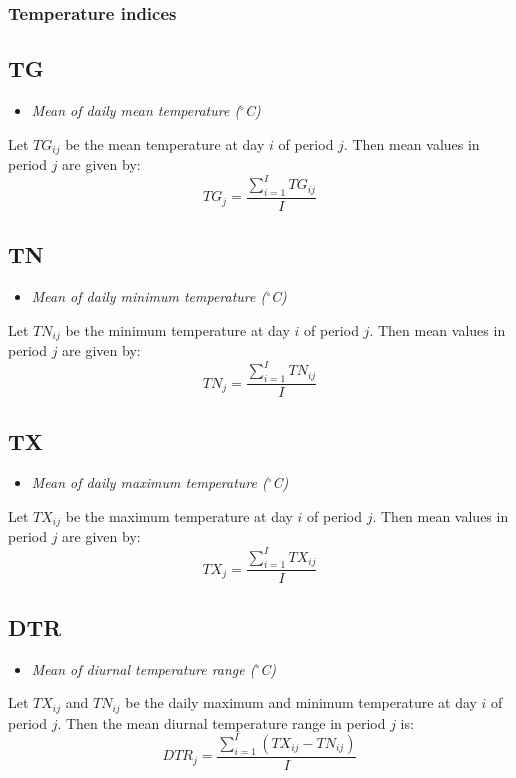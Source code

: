 \documentclass[a4paper,11pt]{article}
\begin{document}
\subsubsection{Temperature indices}

\subsection*{TG}
\begin{itemize}
\item \textit{Mean of daily mean temperature ($^\circ$C)}
\end{itemize}
Let $TG_{ij}$ be the mean temperature at day $i$ of period $j$. Then
mean values in period $j$ are given by:
\begin{equation*}
TG_{j} = \frac{\sum_{i=1}^{I}TG_{ij}}{I}
\end{equation*}

\subsection*{TN}
\begin{itemize}
\item \textit{Mean of daily minimum temperature ($^\circ$C)}
\end{itemize}
Let $TN_{ij}$ be the minimum temperature at day $i$ of period $j$. Then
mean values in period $j$ are given by:
\begin{equation*}
TN_{j} = \frac{\sum_{i=1}^{I}TN_{ij}}{I}
\end{equation*}

\subsection*{TX}
\begin{itemize}
\item \textit{Mean of daily maximum temperature ($^\circ$C)}
\end{itemize}
Let $TX_{ij}$ be the maximum temperature at day $i$ of period $j$. Then
mean values in period $j$ are given by:
\begin{equation*}
TX_{j} = \frac{\sum_{i=1}^{I}TX_{ij}}{I}
\end{equation*}

\subsection*{DTR}
\begin{itemize}
\item \textit{Mean of diurnal temperature range ($^\circ$C)}
\end{itemize}
Let $TX_{ij}$ and $TN_{ij}$ be the daily maximum and minimum
temperature at day $i$ of period $j$. Then the mean diurnal
temperature range in period $j$ is:
\begin{equation*}
DTR_{j} = \frac{\sum_{i=1}^{I}(TX_{ij} - TN_{ij})}{I}
\end{equation*}
\end{document}
